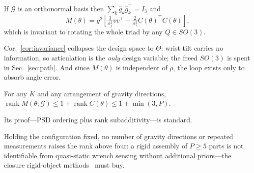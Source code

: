 \begin{corollary}
\label{cor:invariance}
If $\mathcal{G}$ is an orthonormal basis then $\sum_k\hat g_k\hat g_k^{\!\top}
=I_3$ and
\begin{equation}
M(\theta)=g^2\!\left[\tfrac{3}{\sigma_f^2}vv^{\!\top}
+\tfrac{2}{\sigma_\tau^2}C(\theta)^{\!\top}C(\theta)\right],
\label{eq:triad}
\end{equation}
which is invariant to rotating the whole triad by any $Q\in SO(3)$.
\end{corollary}

Cor.~\ref{cor:invariance} collapses the design space to $\Theta$: wrist tilt
carries no information, so articulation is the \emph{only} design variable;
the freed $SO(3)$ is spent in Sec.~\ref{sec:path}. And since $M(\theta)$ is
independent of $\rho$, the loop exists only to absorb angle error.

\begin{proposition}
\label{prop:rank}
For any $K$ and any arrangement of gravity directions,
$\operatorname{rank}M(\theta;\mathcal{G})\le1+\operatorname{rank}C(\theta)
\le1+\min(3,P)$.
\end{proposition}

Its proof---PSD ordering plus rank subadditivity---is standard.

\begin{corollary}
\label{cor:rigid}
Holding the configuration fixed, no number of gravity directions or repeated
measurements raises the rank above four: a rigid assembly of $P\ge5$ parts is
not identifiable from quasi-static wrench sensing without additional
priors---the closure rigid-object
methods~\cite{nadeau2023sum,pfaff2025scalable,shuai2025pugs} must buy.
\end{corollary}

